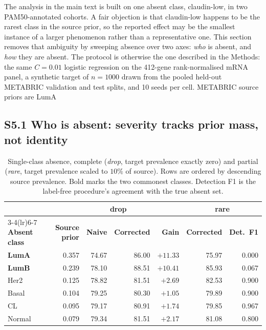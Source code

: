 \documentclass[11pt,a4paper]{article}
\begin{document}
The analysis in the main text is built on one absent class, claudin-low, in two
PAM50-annotated cohorts. A fair objection is that claudin-low happens to be the rarest
class in the source prior, so the reported effect may be the smallest instance of a
larger phenomenon rather than a representative one. This section removes that
ambiguity by sweeping absence over two axes: \emph{who} is absent, and \emph{how} they
are absent. The protocol is otherwise the one described in the Methods: the same
$C{=}0.01$ logistic regression on the 412-gene rank-normalised mRNA panel, a synthetic
target of $n{=}1000$ drawn from the pooled held-out METABRIC validation and test
splits, and 10 seeds per cell. METABRIC source priors are
LumA %

\subsection*{S5.1 Who is absent: severity tracks prior mass, not identity}

\begin{table}[H]
\centering
\caption{Single-class absence, complete (\emph{drop}, target prevalence exactly zero)
and partial (\emph{rare}, target prevalence scaled to $10\%$ of source). Rows are ordered
by descending source prevalence. Bold marks the two commonest classes. Detection F1 is
the label-free procedure's agreement with the true absent set.}
\label{supp:tab:who}
\begin{tabular}{lrrrrrr}
\toprule
& & \multicolumn{2}{c}{\textbf{drop}} & & \multicolumn{2}{c}{\textbf{rare}} \\
\cmidrule(lr){3-4}\cmidrule(lr){6-7}
\textbf{Absent class} & \textbf{Source prior} & \textbf{Naive} & \textbf{Corrected} & \textbf{Gain} & \textbf{Corrected} & \textbf{Det.\ F1} \\
\midrule
    \textbf{LumA} & 0.357 & 74.67 & 86.00 & $+11.33$ & 75.97 & 0.000 \\
    \textbf{LumB} & 0.239 & 78.10 & 88.51 & $+10.41$ & 85.93 & 0.067 \\
    Her2 & 0.125 & 78.82 & 81.51 & $+2.69$ & 82.53 & 0.900 \\
    Basal & 0.104 & 79.25 & 80.30 & $+1.05$ & 79.89 & 0.900 \\
    CL & 0.095 & 79.17 & 80.91 & $+1.74$ & 79.85 & 0.967 \\
    Normal & 0.079 & 79.34 & 81.51 & $+2.17$ & 81.08 & 0.800 \\
    \bottomrule
\end{tabular}
\end{table}
\end{document}
